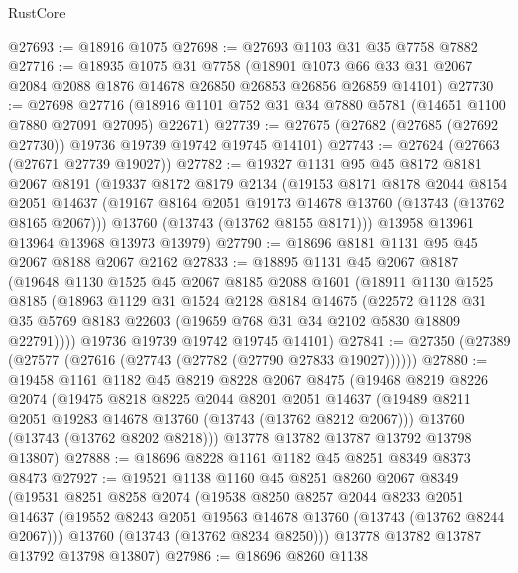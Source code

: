 \begin{lexlean}{RustCore}
\begin{coremodule}
@27693 := @18916 @1075
@27698 := @27693 @1103 @31 @35 @7758 @7882
@27716 := @18935
    @1075
    @31
    @7758
    (@18901 @1073 @66 @33 @31 @2067 @2084 @2088 @1876 @14678 @26850 @26853 @26856 @26859 @14101)
@27730 := @27698
    @27716
    (@18916 @1101 @752 @31 @34 @7880 @5781 (@14651 @1100 @7880 @27091 @27095) @22671)
@27739 := @27675 (@27682 (@27685 (@27692 @27730)) @19736 @19739 @19742 @19745 @14101)
@27743 := @27624 (@27663 (@27671 @27739 @19027))
@27782 := @19327
    @1131
    @95
    @45
    @8172
    @8181
    @2067
    @8191
    (@19337
      @8172
      @8179
      @2134
      (@19153
        @8171
        @8178
        @2044
        @8154
        @2051
        @14637
        (@19167 @8164 @2051 @19173 @14678 @13760 (@13743 (@13762 @8165 @2067)))
        @13760
        (@13743 (@13762 @8155 @8171)))
      @13958
      @13961
      @13964
      @13968
      @13973
      @13979)
@27790 := @18696 @8181 @1131 @95 @45 @2067 @8188 @2067 @2162
@27833 := @18895
    @1131
    @45
    @2067
    @8187
    (@19648
      @1130
      @1525
      @45
      @2067
      @8185
      @2088
      @1601
      (@18911
        @1130
        @1525
        @8185
        (@18963
          @1129
          @31
          @1524
          @2128
          @8184
          @14675
          (@22572
            @1128
            @31
            @35
            @5769
            @8183
            @22603
            (@19659 @768 @31 @34 @2102 @5830 @18809 @22791))))
      @19736
      @19739
      @19742
      @19745
      @14101)
@27841 := @27350 (@27389 (@27577 (@27616 (@27743 (@27782 (@27790 @27833 @19027))))))
@27880 := @19458
    @1161
    @1182
    @45
    @8219
    @8228
    @2067
    @8475
    (@19468
      @8219
      @8226
      @2074
      (@19475
        @8218
        @8225
        @2044
        @8201
        @2051
        @14637
        (@19489 @8211 @2051 @19283 @14678 @13760 (@13743 (@13762 @8212 @2067)))
        @13760
        (@13743 (@13762 @8202 @8218)))
      @13778
      @13782
      @13787
      @13792
      @13798
      @13807)
@27888 := @18696 @8228 @1161 @1182 @45 @8251 @8349 @8373 @8473
@27927 := @19521
    @1138
    @1160
    @45
    @8251
    @8260
    @2067
    @8349
    (@19531
      @8251
      @8258
      @2074
      (@19538
        @8250
        @8257
        @2044
        @8233
        @2051
        @14637
        (@19552 @8243 @2051 @19563 @14678 @13760 (@13743 (@13762 @8244 @2067)))
        @13760
        (@13743 (@13762 @8234 @8250)))
      @13778
      @13782
      @13787
      @13792
      @13798
      @13807)
@27986 := @18696
    @8260
    @1138

\end{coremodule}
\end{lexlean}
